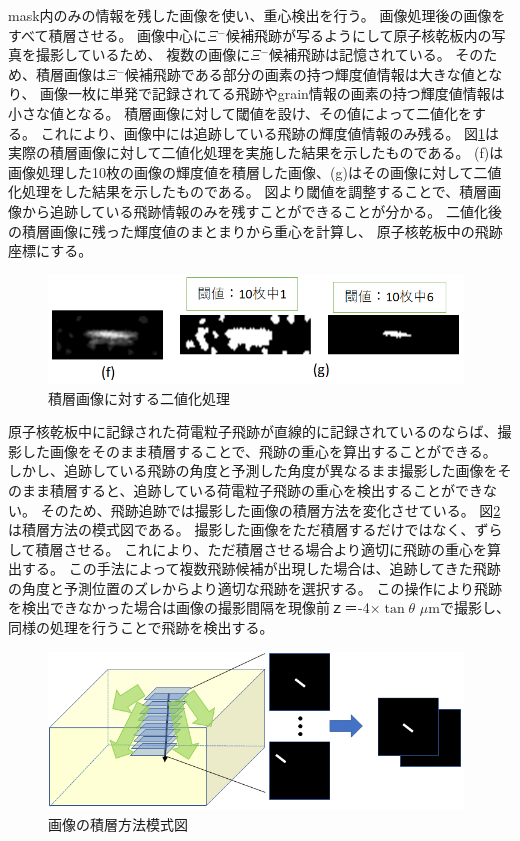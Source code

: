 \documentclass[12pt,a4paper]{jarticle}
\begin{document}
\newpage
\par
mask内のみの情報を残した画像を使い、重心検出を行う。
画像処理後の画像をすべて積層させる。
画像中心に$\Xi$$^-$候補飛跡が写るようにして原子核乾板内の写真を撮影しているため、
複数の画像に$\Xi$$^-$候補飛跡は記憶されている。
そのため、積層画像は$\Xi$$^-$候補飛跡である部分の画素の持つ輝度値情報は大きな値となり、
画像一枚に単発で記録されてる飛跡やgrain情報の画素の持つ輝度値情報は小さな値となる。
積層画像に対して閾値を設け、その値によって二値化をする。
これにより、画像中には追跡している飛跡の輝度値情報のみ残る。
図\ref{fig:sekisou_nitika}は実際の積層画像に対して二値化処理を実施した結果を示したものである。
(f)は画像処理した10枚の画像の輝度値を積層した画像、(g)はその画像に対して二値化処理をした結果を示したものである。
図より閾値を調整することで、積層画像から追跡している飛跡情報のみを残すことができることが分かる。
二値化後の積層画像に残った輝度値のまとまりから重心を計算し、
原子核乾板中の飛跡座標にする。
\begin{figure}[htbp]
  \centering
     \includegraphics[width=110mm]{tuiseki_gazou2.png}
  \caption{積層画像に対する二値化処理\label{fig:sekisou_nitika}}
\end{figure}
\par
原子核乾板中に記録された荷電粒子飛跡が直線的に記録されているのならば、撮影した画像をそのまま積層することで、飛跡の重心を算出することができる。
しかし、追跡している飛跡の角度と予測した角度が異なるまま撮影した画像をそのまま積層すると、追跡している荷電粒子飛跡の重心を検出することができない。
そのため、飛跡追跡では撮影した画像の積層方法を変化させている。
図\ref{fig:sekisou_mosikizu}は積層方法の模式図である。
撮影した画像をただ積層するだけではなく、ずらして積層させる。
これにより、ただ積層させる場合より適切に飛跡の重心を算出する。
この手法によって複数飛跡候補が出現した場合は、追跡してきた飛跡の角度と予測位置のズレからより適切な飛跡を選択する。
この操作により飛跡を検出できなかった場合は画像の撮影間隔を現像前ｚ＝-4×$\tan$$\theta$ $\mu$mで撮影し、同様の処理を行うことで飛跡を検出する。
\begin{figure}[htbp]
  \centering
     \includegraphics[width=110mm]{sekisou_step3.png}
  \caption{画像の積層方法模式図\label{fig:sekisou_mosikizu}}
\end{figure}
\end{document}
